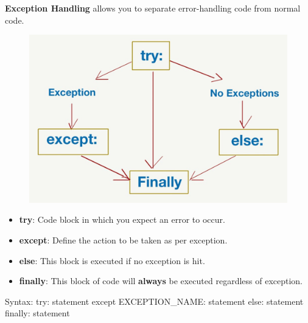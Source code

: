 \setlength{\columnsep}{3pt}
\begin{flushleft}
	\bigskip
	
	\textbf{Exception Handling} allows you to separate error-handling code from normal code.
	
	\begin{figure}[h!]
		\centering
		\includegraphics[scale=0.3]{content/chapter9/images/except.jpeg}
	\end{figure}
	
	\begin{itemize}
		\item \textbf{try}: Code block in which you expect an error to occur.
		\bigskip
		\item \textbf{except}: Define the action to be taken as per exception.
		\bigskip
		\item \textbf{else}: This block is executed if no exception is hit.
		\bigskip
		\item \textbf{finally}: This block of code will \textbf{always} be executed regardless of exception.	
	\end{itemize}

	\begin{tcolorbox}[breakable,notitle,boxrule=1pt,colback=pink,colframe=pink]
		\color{black}
		\font=8pt
		Syntax: 
		\newline
		try: \newline
		\hphantom{} \hphantom{} statement \newline
		except EXCEPTION\_NAME: \newline
		\hphantom{} \hphantom{} statement \newline
		else: \newline
		\hphantom{} \hphantom{} statement \newline
		finally: \newline
		\hphantom{} \hphantom{} statement
		\font=4pt
	\end{tcolorbox}
	

\end{flushleft}
